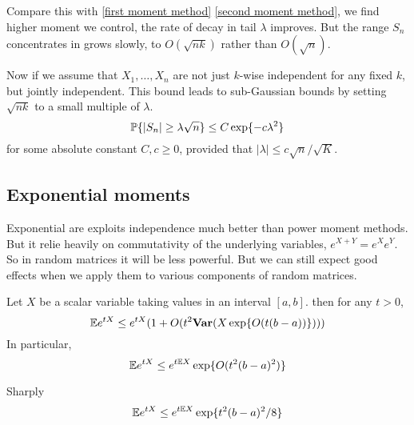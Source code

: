 Compare this with \ref{first moment method} \ref{second moment method}, we find higher moment we control, the rate of decay in tail $\lambda$ improves.
But the range $S_n$ concentrates in grows slowly, to $O(\sqrt{nk})$ rather than $O(\sqrt{n})$. 

Now if we assume that $X_1,\dots,X_n$ are not just $k$-wise independent for any fixed $k$, but jointly independent. This bound leads to sub-Gaussian bounds by setting $\sqrt{nk}$ to a small multiple of $\lambda$.
\begin{equation}
    \label{Sub-Gaussian type bound for sum of independent bounded variable}
    \mathbb{P}\{|S_n| \geq \lambda \sqrt{n}\} \leq C \exp \{-c\lambda^2 \}
\end{equation}
for some absolute constant $C,c\geq 0$, provided that $|\lambda| \leq c\sqrt{n}/\sqrt{K}$.


\subsection{Exponential moments}

\begin{remark}
    Exponential are exploits independence much better than power moment methods. But it relie heavily on commutativity of the underlying variables, $e^{X+Y} = e^Xe^Y$. So in random matrices it will be less powerful. 
    But we can still expect good effects when we apply them to various components of random matrices.
\end{remark}

\begin{lemma}
    \label{Hoeffding lemma}
    Let $X$ be a scalar variable taking values in an interval $[a,b]$. then for any $t>0$,
    \begin{equation}
        \mathbb{E} e^{tX} \leq e^{tX}(1+O(t^2\mathbf{Var} (X \exp \{O(t(b-a))\})))
    \end{equation} 
    In particular,
    \begin{equation}\label{Hoeffding lemma particular}
        \mathbb{E} e^{tX} \leq e^{t\mathbb{E} X} \exp \{O(t^2(b-a)^2)\}
    \end{equation}

    Sharply
    \begin{equation}
        \mathbb{E} e^{tX} \leq e^{t\mathbb{E} X} \exp \{t^2(b-a)^2/8\}
    \end{equation}
\end{lemma}

